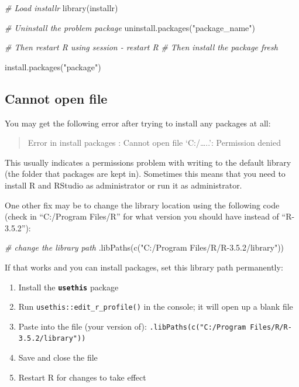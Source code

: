 \documentclass[
  oneside]{book}
\newenvironment{Shaded}{\begin{snugshade}}{\end{snugshade}}
\newcommand{\CommentTok}[1]{\textcolor[rgb]{0.56,0.35,0.01}{\textit{#1}}}
\newcommand{\FunctionTok}[1]{\textcolor[rgb]{0.00,0.00,0.00}{#1}}
\newcommand{\NormalTok}[1]{#1}
\newcommand{\StringTok}[1]{\textcolor[rgb]{0.31,0.60,0.02}{#1}}
\providecommand{\tightlist}{%
  \setlength{\itemsep}{0pt}\setlength{\parskip}{0pt}}
\begin{document}
\begin{Shaded}
\begin{Highlighting}[]
\CommentTok{\# Load installr}
\FunctionTok{library}\NormalTok{(installr)}

\CommentTok{\# Uninstall the problem package}
\FunctionTok{uninstall.packages}\NormalTok{(}\StringTok{"package\_name"}\NormalTok{)}

\CommentTok{\# Then restart R using session {-} restart R}
\CommentTok{\# Then install the package fresh}

\FunctionTok{install.packages}\NormalTok{(}\StringTok{"package"}\NormalTok{)}
\end{Highlighting}
\end{Shaded}

\hypertarget{cannot-open-file}{%
\subsection{Cannot open file}\label{cannot-open-file}}

You may get the following error after trying to install any packages at all:

\begin{quote}
Error in install packages : Cannot open file `C:/\ldots..': Permission denied
\end{quote}

This usually indicates a permissions problem with writing to the default library (the folder that packages are kept in). Sometimes this means that you need to install R and RStudio as administrator or run it as administrator.

One other fix may be to change the library location using the following code (check in ``C:/Program Files/R'' for what version you should have instead of ``R-3.5.2''):

\begin{Shaded}
\begin{Highlighting}[]
\CommentTok{\# change the library path}
\FunctionTok{.libPaths}\NormalTok{(}\FunctionTok{c}\NormalTok{(}\StringTok{"C:/Program Files/R/R{-}3.5.2/library"}\NormalTok{))}
\end{Highlighting}
\end{Shaded}

If that works and you can install packages, set this library path permanently:

\begin{enumerate}
\def\labelenumi{\arabic{enumi}.}
\tightlist
\item
  Install the \textbf{\texttt{usethis}} package
\item
  Run \texttt{usethis::edit\_r\_profile()} in the console; it will open up a blank file
\item
  Paste into the file (your version of): \texttt{.libPaths(c("C:/Program\ Files/R/R-3.5.2/library"))}
\item
  Save and close the file
\item
  Restart R for changes to take effect
\end{enumerate}
\end{document}

